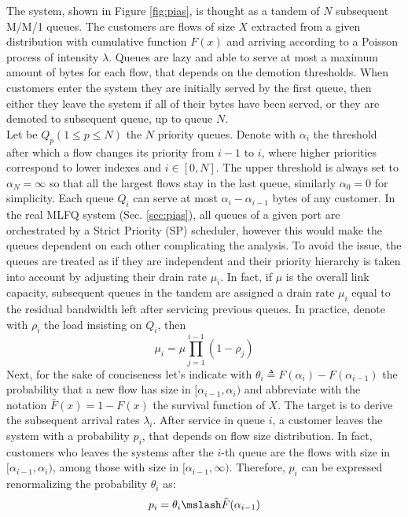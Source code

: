 The system, shown in Figure \ref{fig:pias}, is thought as a tandem of $N$ subsequent M/M/1 queues.  The customers are flows of size $X$ extracted from a given distribution with cumulative function $F(x)$ and arriving according to a Poisson process of intensity $\lambda$. Queues are lazy and able to serve at most a maximum amount of bytes for each flow, that depends on the demotion thresholds. When customers enter the system they are initially served by the first queue, then either they leave the system if all of their bytes have been served, or they are demoted to subsequent queue, up to queue $N$. \\ 
Let be $Q_p(1 \le p \le N)$ the $N$ priority queues. Denote with $\alpha_i$ the threshold after which a flow changes its priority from $i-1$ to $i$, where higher priorities correspond to lower indexes and $i \in [0,N]$. The upper threshold is always set to $\alpha_N = \infty$ so that all the largest flows stay in the last queue, similarly $\alpha_0 = 0$ for simplicity. Each queue $Q_i$ can serve at most $\alpha_i - \alpha_{i-1}$ bytes of any customer. In the real MLFQ system (Sec. \ref{sec:pias}), all queues of a given port are orchestrated by a Strict Priority (SP) scheduler, however this would make the queues dependent on each other complicating the analysis. To avoid the issue, the queues are treated as if they are independent and their priority hierarchy is taken into account by adjusting their drain rate $\mu_i$. In fact, if $\mu$ is the overall link capacity, subsequent queues in the tandem are assigned a drain rate $\mu_i$ equal to the residual bandwidth left after servicing previous queues. In practice, denote with $\rho_i$ the load insisting on $Q_i$, then 
\begin{equation}
\mu_i = \mu \prod_{j=1}^{i-1} (1-\rho_j)
\end{equation}
Next, for the sake of conciseness let's indicate with $\theta_i \triangleq F(\alpha_{i}) - F(\alpha_{i-1})$ the probability that a new flow has size in $[\alpha_{i-1}, \alpha_{i})$ and abbreviate with the notation $\bar{F}(x) = 1 - F(x)$ the survival function of $X$. The target is to derive the subsequent arrival rates $\lambda_i$.
After service in queue $i$, a customer leaves the system with a probability $p_i$, that depends on flow size distribution. In fact, customers who leaves the systems after the $i$-th queue are the flows with size in $[\alpha_{i-1}, \alpha_{i})$, among those with size in $[\alpha_{i-1}, \infty)$. Therefore, $p_i$ can be expressed renormalizing the probability $\theta_i$ as:
\[
p_i = \theta_i \mslash \bar{F}(\alpha_{i-1})
\]
